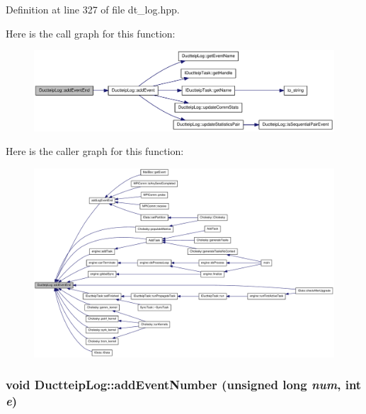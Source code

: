 Definition at line 327 of file dt\_\-log.hpp.

Here is the call graph for this function:\nopagebreak
\begin{figure}[H]
\begin{center}
\leavevmode
\includegraphics[width=369pt]{class_ductteip_log_a9a010d4387f7f74b848d5c36aaacd501_cgraph}
\end{center}
\end{figure}


Here is the caller graph for this function:\nopagebreak
\begin{figure}[H]
\begin{center}
\leavevmode
\includegraphics[width=420pt]{class_ductteip_log_a9a010d4387f7f74b848d5c36aaacd501_icgraph}
\end{center}
\end{figure}
\hypertarget{class_ductteip_log_a0edeefb537663709b3d284e60ed51b96}{
\subsubsection[{addEventNumber}]{\setlength{\rightskip}{0pt plus 5cm}void DuctteipLog::addEventNumber (unsigned long {\em num}, \/  int {\em e})}}
\label{class_ductteip_log_a0edeefb537663709b3d284e60ed51b96}


